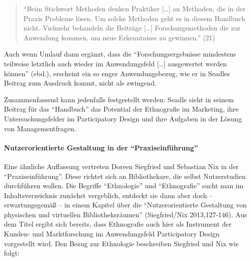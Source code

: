 \documentclass[a4paper,
fontsize=11pt,
oneside,
numbers=noperiodatend,
parskip=half-,
bibliography=totoc,
final
]{scrartcl}
\begin{document}
\begin{quote}
\enquote{Beim Stichwort Methoden denken Praktiker {[}\ldots{}{]} an
Methoden, die in der Praxis Probleme lösen. Um solche Methoden geht es
in diesem Handbuch nicht. Vielmehr behandeln die Beiträge {[}\ldots{}{]}
Forschungsmethoden die zur Anwendung kommen, um neue Erkenntnisse zu
gewinnen.} (21)
\end{quote}

Auch wenn Umlauf dann ergänzt, dass die \enquote{Forschungsergebnisse
mindestens teilweise letztlich auch wieder im Anwendungsfeld
{[}\ldots{}{]} ausgewertet werden können} (ebd.), erscheint ein so enger
Anwendungsbezug, wie er in Seadles Beitrag zum Ausdruck kommt, nicht als
zwingend.

Zusammenfassend kann jedenfalls festgestellt werden: Seadle sieht in
seinem Beitrag für das \enquote{Handbuch} das Potential der Ethnografie
im Marketing, ihre Untersuchungsfelder im Participatory Design und ihre
Aufgaben in der Lösung von Managementfragen.

\paragraph{Nutzerorientierte Gestaltung in der
\enquote{Praxiseinführung}}\label{nutzerorientierte-gestaltung-in-der-praxiseinfuxfchrung}

Eine ähnliche Auffassung vertreten Doreen Siegfried und Sebastian Nix in
der \enquote{Praxiseinführung}. Diese richtet sich an Bibliothekare, die
selbst Nutzerstudien durchführen wollen. Die Begriffe
\enquote{Ethnologie} und \enquote{Ethnografie} sucht man im
Inhaltsverzeichnis zunächst vergeblich, entdeckt sie dann aber doch --
erwartungsgemäß -- in einem Kapitel über die \enquote{Nutzerorientierte
Gestaltung von physischen und virtuellen Bibliotheksräumen}
(Siegfried/Nix 2013,127-146). Aus dem Titel ergibt sich bereits, dass
Ethnografie auch hier als Instrument der Kunden- und Marktforschung im
Anwendungsfeld Participatory Design vorgestellt wird. Den Bezug zur
Ethnologie beschreiben Siegfried und Nix wie folgt:
\end{document}
